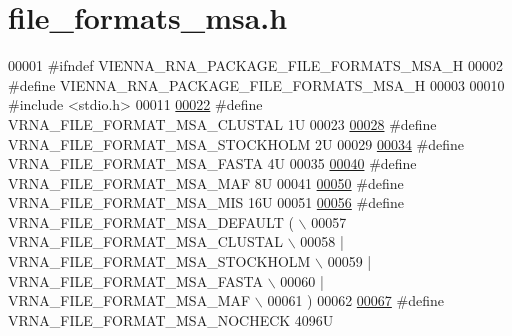 \hypertarget{io_2file__formats__msa_8h_source}{}\section{file\+\_\+formats\+\_\+msa.\+h}
\label{io_2file__formats__msa_8h_source}

\begin{DoxyCode}
00001 \textcolor{preprocessor}{#ifndef VIENNA\_RNA\_PACKAGE\_FILE\_FORMATS\_MSA\_H}
00002 \textcolor{preprocessor}{#define VIENNA\_RNA\_PACKAGE\_FILE\_FORMATS\_MSA\_H}
00003 
00010 \textcolor{preprocessor}{#include <stdio.h>}
00011 
\hyperlink{group__file__formats__msa_ga79a23de2c7249f2cccd762e475c81859}{00022} \textcolor{preprocessor}{#define VRNA\_FILE\_FORMAT\_MSA\_CLUSTAL      1U}
00023 
\hyperlink{group__file__formats__msa_ga62be992445cd8ab2ad7a8fded944338b}{00028} \textcolor{preprocessor}{#define VRNA\_FILE\_FORMAT\_MSA\_STOCKHOLM    2U}
00029 
\hyperlink{group__file__formats__msa_gacf6274a2c825f34e4131404665b00604}{00034} \textcolor{preprocessor}{#define VRNA\_FILE\_FORMAT\_MSA\_FASTA        4U}
00035 
\hyperlink{group__file__formats__msa_gab3186d774c01570d2a47d0308eec4927}{00040} \textcolor{preprocessor}{#define VRNA\_FILE\_FORMAT\_MSA\_MAF          8U}
00041 
\hyperlink{group__file__formats__msa_ga494488a771aa0c602fb4cf445be34d47}{00050} \textcolor{preprocessor}{#define VRNA\_FILE\_FORMAT\_MSA\_MIS          16U}
00051 
\hyperlink{group__file__formats__msa_ga4acc255373831856a8417b68de8a94c0}{00056} \textcolor{preprocessor}{#define VRNA\_FILE\_FORMAT\_MSA\_DEFAULT      ( \(\backslash\)}
00057 \textcolor{preprocessor}{    VRNA\_FILE\_FORMAT\_MSA\_CLUSTAL \(\backslash\)}
00058 \textcolor{preprocessor}{    | VRNA\_FILE\_FORMAT\_MSA\_STOCKHOLM \(\backslash\)}
00059 \textcolor{preprocessor}{    | VRNA\_FILE\_FORMAT\_MSA\_FASTA \(\backslash\)}
00060 \textcolor{preprocessor}{    | VRNA\_FILE\_FORMAT\_MSA\_MAF \(\backslash\)}
00061 \textcolor{preprocessor}{    )}
00062 
\hyperlink{group__file__formats__msa_ga229fb3778ecabea4782902b69fa48fd1}{00067} \textcolor{preprocessor}{#define VRNA\_FILE\_FORMAT\_MSA\_NOCHECK      4096U}

\end{DoxyCode}
